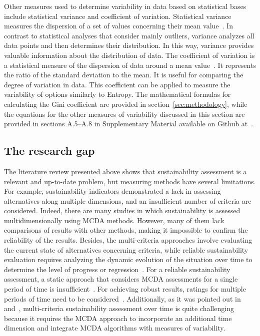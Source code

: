\documentclass[final,5p,times,twocolumn,authoryear]{elsarticle}
\newcounter{example}[section]
\begin{document}
Other measures used to determine variability in data based on statistical bases include statistical variance and coefficient of variation. Statistical variance measures the dispersion of a set of values concerning their mean value~\citep{rao2010subjective}. In contrast to statistical analyses that consider mainly outliers, variance analyzes all data points and then determines their distribution. In this way, variance provides valuable information about the distribution of data. The coefficient of variation is a statistical measure of the dispersion of data around a mean value~\citep{shuai2012new}. It represents the ratio of the standard deviation to the mean. It is useful for comparing the degree of variation in data. This coefficient can be applied to measure the variability of options similarly to Entropy. The mathematical formulas for calculating the Gini coefficient are provided in section~\ref{sec:methodology}, while the equations for the other measures of variability discussed in this section are provided in sections A.5--A.8 in Supplementary Material available on Github at~\citep{dariagithub2022}.

\subsection{The research gap}
The literature review presented above shows that sustainability assessment is a relevant and up-to-date problem, but measuring methods have several limitations. For example, sustainability indicators demonstrated a lack in assessing alternatives along multiple dimensions, and an insufficient number of criteria are considered. Indeed, there are many studies in which sustainability is assessed multidimensionally using MCDA methods. However, many of them lack comparisons of results with other methods, making it impossible to confirm the reliability of the results. Besides, the multi-criteria approaches involve evaluating the current state of alternatives concerning criteria, while reliable sustainability evaluation requires analyzing the dynamic evolution of the situation over time to determine the level of progress or regression~\citep{frini2020temporal}. 
%
For a reliable sustainability assessment, a static approach that considers MCDA assessments for a single period of time is insufficient~\citep{frini2018making}. For achieving robust results, ratings for multiple periods of time need to be considered~\citep{martins2021multidimensional}.
%
Additionally, as it was pointed out in~\citep{banamar2018extension} and~\citep{urli2019promethee}, multi-criteria sustainability assessment over time is quite challenging because it requires the MCDA approach to incorporate an additional time dimension and integrate MCDA algorithms with measures of variability.
\end{document}

